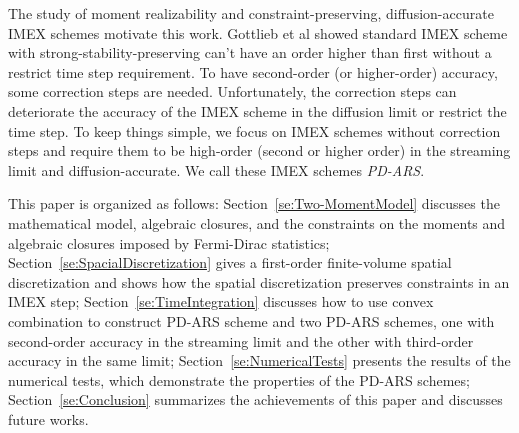 The study of moment realizability and constraint-preserving, diffusion-accurate IMEX schemes motivate this work.
Gottlieb et al\cite{gottlieb_etal_2001} showed standard IMEX scheme with strong-stability-preserving can't have an order higher than first without a restrict time step requirement.
To have second-order (or higher-order) accuracy, some correction steps are needed.
Unfortunately, the correction steps can deteriorate the accuracy of the IMEX scheme in the diffusion limit or restrict the time step.
To keep things simple, we focus on IMEX schemes without correction steps and require them to be high-order (second or higher order) in the streaming limit and diffusion-accurate.
We call these IMEX schemes \textit{PD-ARS}.

This paper is organized as follows: Section~\ref{se:Two-MomentModel} discusses the mathematical model, algebraic closures, and the constraints on the moments and algebraic closures imposed by Fermi-Dirac statistics;
Section~\ref{se:SpacialDiscretization} gives a first-order finite-volume spatial discretization and shows how the spatial discretization preserves constraints in an IMEX step;
Section~\ref{se:TimeIntegration} discusses how to use convex combination to construct PD-ARS scheme and two PD-ARS schemes, one with second-order accuracy in the streaming limit and the other with third-order accuracy in the same limit;
Section~\ref{se:NumericalTests} presents the results of the numerical tests, which demonstrate the properties of the PD-ARS schemes; Section~\ref{se:Conclusion} summarizes the achievements of this paper and discusses future works.

